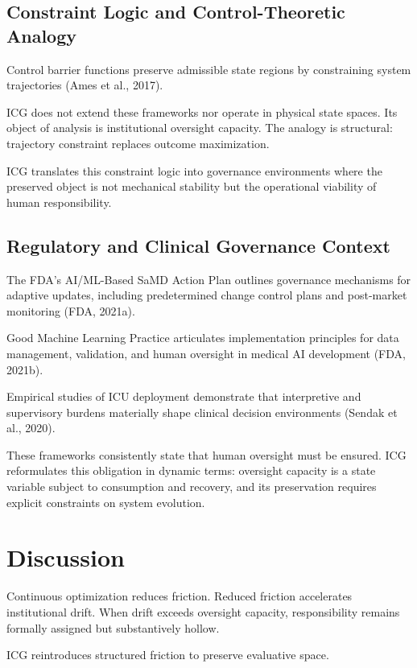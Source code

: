 \documentclass[12pt]{article}
\begin{document}
\subsection{Constraint Logic and Control-Theoretic Analogy}

Control barrier functions preserve admissible state regions by constraining system
trajectories (Ames et al., 2017).

ICG does not extend these frameworks nor operate in physical state spaces. Its object of
analysis is institutional oversight capacity. The analogy is structural: trajectory
constraint replaces outcome maximization.

ICG translates this constraint logic into governance environments where the preserved
object is not mechanical stability but the operational viability of human responsibility.

\subsection{Regulatory and Clinical Governance Context}

The FDA's AI/ML-Based SaMD Action Plan outlines governance mechanisms for adaptive updates,
including predetermined change control plans and post-market monitoring (FDA, 2021a).

Good Machine Learning Practice articulates implementation principles for data management,
validation, and human oversight in medical AI development (FDA, 2021b).

Empirical studies of ICU deployment demonstrate that interpretive and supervisory burdens
materially shape clinical decision environments (Sendak et al., 2020).

These frameworks consistently state that human oversight must be ensured. ICG reformulates
this obligation in dynamic terms: oversight capacity is a state variable subject to
consumption and recovery, and its preservation requires explicit constraints on system
evolution.

\section{Discussion}

Continuous optimization reduces friction. Reduced friction accelerates institutional drift.
When drift exceeds oversight capacity, responsibility remains formally assigned but
substantively hollow.

ICG reintroduces structured friction to preserve evaluative space.
\end{document}
